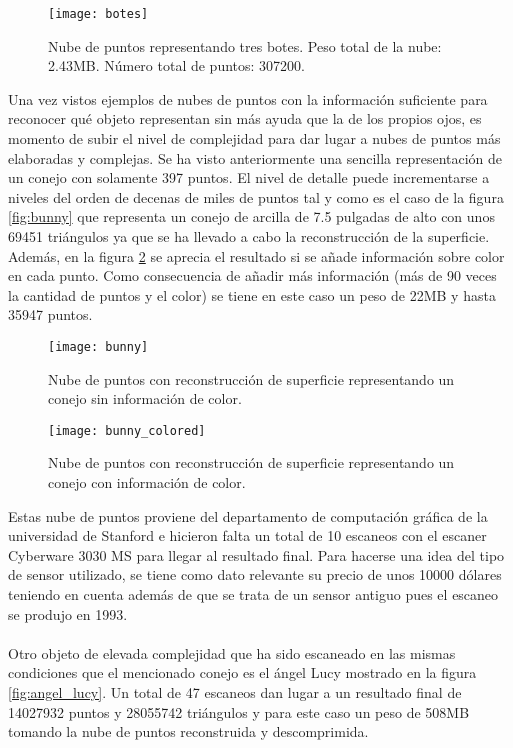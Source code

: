 \begin{figure}
\centering
\texttt{[image: botes]}
  \caption{Nube de puntos representando tres botes.
  Peso total de la nube: 2.43MB.
  Número total de puntos: 307200.}\label{fig:botes_grande}
\end{figure}
Una vez vistos ejemplos de nubes de puntos con la información suficiente para reconocer qué objeto representan sin más ayuda que la de los propios ojos, es momento de subir el nivel de complejidad para dar lugar a nubes de puntos más elaboradas y complejas. Se ha visto anteriormente una sencilla representación de un conejo con solamente 397 puntos. El nivel de detalle puede incrementarse a niveles del orden de decenas de miles de puntos tal y como es el caso de la figura \ref{fig:bunny} que representa un conejo de arcilla\cite{pcl_conejo_stanford} de 7.5 pulgadas de alto con unos 69451 triángulos ya que se ha llevado a cabo la reconstrucción de la superficie. Además, en la figura \ref{fig:bunny_colored} se aprecia el resultado si se añade información sobre color en cada punto. Como consecuencia de añadir más información (más de 90 veces la cantidad de puntos y el color) se tiene en este caso un peso de 22MB y hasta 35947 puntos.
\\
\begin{figure}[!htb]
  \texttt{[image: bunny]}
  \caption{Nube de puntos con reconstrucción de superficie representando un conejo sin información de color.}\label{fig:bunny}
\endminipage\hfill
{}
  \texttt{[image: bunny\_colored]}
  \caption{Nube de puntos con reconstrucción de superficie representando un conejo con información de color.}\label{fig:bunny_colored}
\endminipage\hfill
\end{figure}
Estas nube de puntos proviene del departamento de computación gráfica de la universidad de Stanford e hicieron falta un total de 10 escaneos con el escaner Cyberware 3030 MS\cite{escaner_cyberware} para llegar al resultado final. Para hacerse una idea del tipo de sensor utilizado, se tiene como dato relevante su precio de unos 10000 dólares teniendo en cuenta además de que se trata de un sensor antiguo pues el escaneo se produjo en 1993.
\\
\\
Otro objeto de elevada complejidad que ha sido escaneado en las mismas condiciones que el mencionado conejo es el ángel Lucy\cite{pcl_conejo_stanford} mostrado en la figura \ref{fig:angel_lucy}. Un total de 47 escaneos dan lugar a un resultado final de 14027932 puntos y 28055742 triángulos y para este caso un peso de 508MB tomando la nube de puntos reconstruida y descomprimida.
